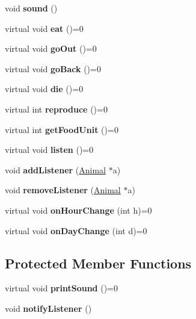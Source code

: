 \begin{DoxyCompactItemize}
void {\bfseries sound} ()
\item 
\mbox{\label{class_animal_ad018a3798fe7ddf30da60d8f2557701b}} 
virtual void {\bfseries eat} ()=0
\item 
\mbox{\label{class_animal_afcacae4af51b4f3fc88a1354f21dc7a7}} 
virtual void {\bfseries go\+Out} ()=0
\item 
\mbox{\label{class_animal_af74e43a1338419fe4582e61e2b4d8d34}} 
virtual void {\bfseries go\+Back} ()=0
\item 
\mbox{\label{class_animal_a6cc3df8555c60352f9c55ca174a9f9df}} 
virtual void {\bfseries die} ()=0
\item 
\mbox{\label{class_animal_aaa82a4b9ceb712c473d84b87c920043f}} 
virtual int {\bfseries reproduce} ()=0
\item 
\mbox{\label{class_animal_a2649b5bbe14978ed2ee966c1518c5fac}} 
virtual int {\bfseries get\+Food\+Unit} ()=0
\item 
\mbox{\label{class_animal_a126acfdd961c2d49373159b256d71b23}} 
virtual void {\bfseries listen} ()=0
\item 
\mbox{\label{class_animal_ae3e210967f50cee3ef1023d985976867}} 
void {\bfseries add\+Listener} (\hyperlink{class_animal}{Animal} $\ast$a)
\item 
\mbox{\label{class_animal_a83e0c4009f62540aca99f0b5ceeb7fdd}} 
void {\bfseries remove\+Listener} (\hyperlink{class_animal}{Animal} $\ast$a)
\item 
\mbox{\label{class_animal_aec682deda01c7165197f7c7eba9ab88c}} 
virtual void {\bfseries on\+Hour\+Change} (int h)=0
\item 
\mbox{\label{class_animal_af4b1639570a362dda44948ed483bf94c}} 
virtual void {\bfseries on\+Day\+Change} (int d)=0
\end{DoxyCompactItemize}
\subsection*{Protected Member Functions}
\begin{DoxyCompactItemize}
\item 
\mbox{\label{class_animal_a93ad63b6239f8f18d167034b7948f35a}} 
virtual void {\bfseries print\+Sound} ()=0
\item 
\mbox{\label{class_animal_aa1ebce4b14be5e3d38c831b51a7ac307}} 
void {\bfseries notify\+Listener} ()
\end{DoxyCompactItemize}
